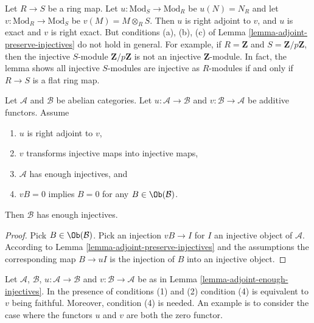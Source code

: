 \begin{remark}
\label{remark-need-left-exactness}
Let $R \to S$ be a ring map. Let $u : \text{Mod}_S \to \text{Mod}_R$
be $u(N) = N_R$ and let $v : \text{Mod}_R \to \text{Mod}_S$ be
$v(M) = M \otimes_R S$. Then $u$ is right adjoint to $v$, and $u$ is
exact and $v$ is right exact. But conditions (a), (b), (c) of
Lemma \ref{lemma-adjoint-preserve-injectives} do not hold in general.
For example, if $R = \mathbf{Z}$ and $S = \mathbf{Z}/p\mathbf{Z}$, then
the injective $S$-module $\mathbf{Z}/p\mathbf{Z}$ is not
an injective $\mathbf{Z}$-module. In fact, the lemma shows
all injective $S$-modules are injective as $R$-modules if and only
if $R \to S$ is a flat ring map.
\end{remark}

\begin{lemma}
\label{lemma-adjoint-enough-injectives}
Let $\mathcal{A}$ and $\mathcal{B}$ be abelian categories.
Let $u : \mathcal{A} \to \mathcal{B}$ and
$v : \mathcal{B} \to \mathcal{A}$ be additive functors.
Assume
\begin{enumerate}
\item $u$ is right adjoint to $v$,
\item $v$ transforms injective maps into injective maps,
\item $\mathcal{A}$ has enough injectives, and
\item $vB = 0$ implies $B = 0$ for any $B \in \Ob(\mathcal{B})$.
\end{enumerate}
Then $\mathcal{B}$ has enough injectives.
\end{lemma}

\begin{proof}
Pick $B \in \Ob(\mathcal{B})$.
Pick an injection $vB \to I$ for $I$
an injective object of $\mathcal{A}$.
According to Lemma \ref{lemma-adjoint-preserve-injectives}
and the assumptions the corresponding map
$B \to uI$ is the injection of $B$ into an injective object.
\end{proof}

\begin{remark}
\label{remark-faithfulness-needed}
Let $\mathcal{A}$, $\mathcal{B}$, $u : \mathcal{A} \to \mathcal{B}$ and
$v : \mathcal{B} \to \mathcal{A}$ be as
in Lemma \ref{lemma-adjoint-enough-injectives}.
In the presence of conditions (1) and (2) condition (4) is equivalent
to $v$ being faithful. Moreover, condition (4) is needed.
An example is to consider the
case where the functors $u$ and $v$ are both the zero functor.
\end{remark}

